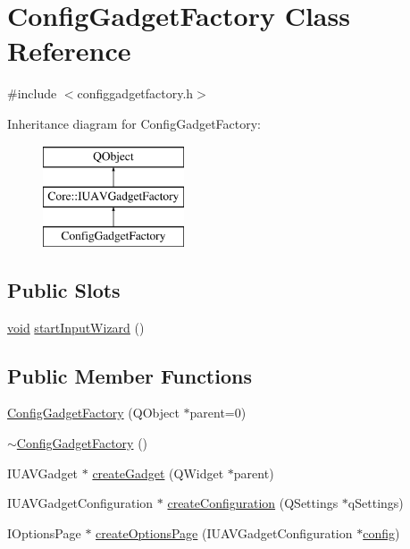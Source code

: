 \hypertarget{class_config_gadget_factory}{\section{Config\-Gadget\-Factory Class Reference}
\label{class_config_gadget_factory}
}


{\ttfamily \#include $<$configgadgetfactory.\-h$>$}

Inheritance diagram for Config\-Gadget\-Factory\-:\begin{figure}[H]
\begin{center}
\leavevmode
\includegraphics[height=3.000000cm]{class_config_gadget_factory}
\end{center}
\end{figure}
\subsection*{Public Slots}
\begin{DoxyCompactItemize}
\item 
\hyperlink{group___u_a_v_objects_plugin_ga444cf2ff3f0ecbe028adce838d373f5c}{void} \hyperlink{group___config_plugin_ga12d479e09d53195a2226e61b1690124f}{start\-Input\-Wizard} ()
\end{DoxyCompactItemize}
\subsection*{Public Member Functions}
\begin{DoxyCompactItemize}
\item 
\hyperlink{group___config_plugin_ga7785d39aeb34203184e554b3f3efda71}{Config\-Gadget\-Factory} (Q\-Object $\ast$parent=0)
\item 
\hyperlink{group___config_plugin_gad9021aa0495e8db3dbaf86f04d7ae1e1}{$\sim$\-Config\-Gadget\-Factory} ()
\item 
I\-U\-A\-V\-Gadget $\ast$ \hyperlink{group___config_plugin_ga0a27d1d7799dadf3e68617090af3054c}{create\-Gadget} (Q\-Widget $\ast$parent)
\item 
I\-U\-A\-V\-Gadget\-Configuration $\ast$ \hyperlink{group___config_plugin_gad4b30018cb53b866caf602b7f5409b0c}{create\-Configuration} (Q\-Settings $\ast$q\-Settings)
\item 
I\-Options\-Page $\ast$ \hyperlink{group___config_plugin_ga371219573cd1b14bbc5d533577281f7b}{create\-Options\-Page} (I\-U\-A\-V\-Gadget\-Configuration $\ast$\hyperlink{deflate_8c_a4473b5227787415097004fd39f55185e}{config})
\end{DoxyCompactItemize}
